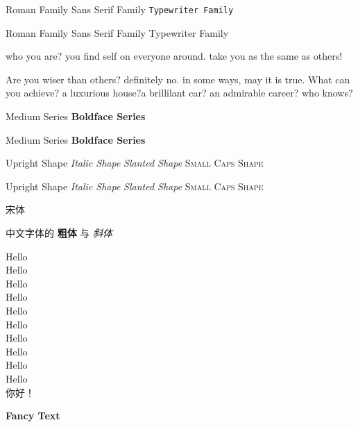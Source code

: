 \documentclass[12pt]{article}
\newcommand{\myfont}{\textbf{\textsf{Fancy Text}}}
\begin{document}
    \textrm{Roman Family} \textsf{Sans Serif Family} \texttt{Typewriter Family}

    \rmfamily Roman Family
    {\sffamily Sans Serif Family}
    {\ttfamily Typewriter Family}

    \sffamily who you are? you find self on everyone around.
    take you as the same as others!

    \ttfamily Are you wiser than others? definitely no. in some ways, 
    may it is true. What can you achieve? 
    a luxurious house?a brillilant car? 
    an admirable career? who knows?

    \textmd{Medium Series} \textbf{Boldface Series}

    {\mdseries Medium Series} {\bfseries Boldface Series}

    \textup{Upright Shape} \textit{Italic Shape}
    \textsl{Slanted Shape} \textsc{Small Caps Shape}

    {\upshape Upright Shape} {\itshape Italic Shape}
    {\slshape Slanted Shape} {\scshape Small Caps Shape}

    {\songti 宋体}   
    
    中文字体的 \textbf{粗体} 与 \textit{斜体}

    {\tiny Hello}\\
    {\scriptsize Hello}\\
    {\footnotesize Hello}\\
    {\small Hello}\\
    {\normalsize Hello}\\
    {\large Hello}\\
    {\Large Hello}\\
    {\LARGE Hello}\\
    {\huge Hello}\\
    {\Huge Hello}\\

     你好！
    
    \myfont
\end{document}
